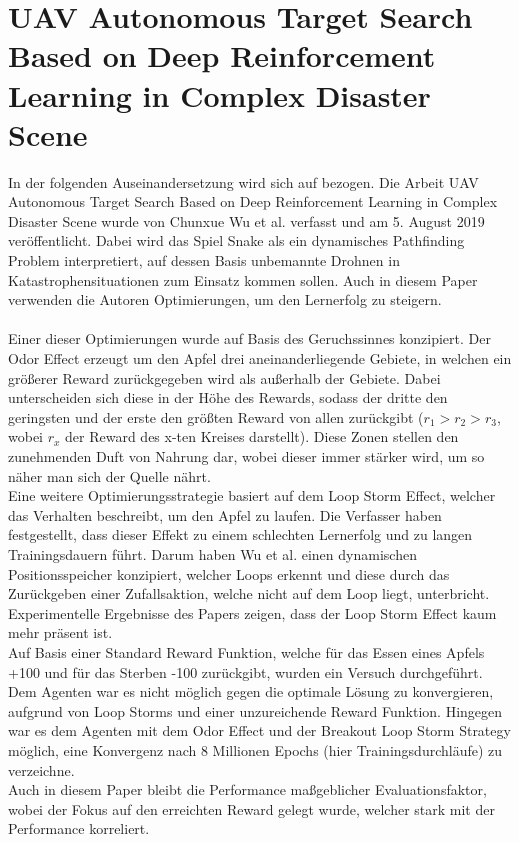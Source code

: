 \section{UAV Autonomous Target Search Based on Deep Reinforcement Learning in Complex Disaster Scene} \label{sec:Paper_2}
In der folgenden Auseinandersetzung wird sich auf \cite{UAV} bezogen.
Die Arbeit UAV Autonomous Target Search Based on Deep Reinforcement Learning in Complex Disaster Scene wurde von Chunxue Wu et al. verfasst und am 5. August 2019 veröffentlicht. Dabei wird das Spiel Snake als ein dynamisches Pathfinding Problem interpretiert, auf dessen Basis unbemannte Drohnen in Katastrophensituationen zum Einsatz kommen sollen. 
Auch in diesem Paper verwenden die Autoren Optimierungen, um den Lernerfolg zu steigern.\\
\\Einer dieser Optimierungen wurde auf Basis des Geruchssinnes konzipiert. Der Odor Effect erzeugt um den Apfel drei aneinanderliegende Gebiete, in welchen ein größerer Reward zurückgegeben wird als außerhalb der Gebiete. Dabei unterscheiden sich diese in der Höhe des Rewards, sodass der dritte den geringsten und der erste den größten Reward von allen zurückgibt ($r_1 > r_2 > r_3$, wobei $r_x$ der Reward des x-ten Kreises darstellt). Diese Zonen stellen den zunehmenden Duft von Nahrung dar, wobei dieser immer stärker wird, um so näher man sich der Quelle nährt.\\
Eine weitere Optimierungsstrategie basiert auf dem Loop Storm Effect, welcher das Verhalten beschreibt, um den Apfel zu laufen. Die Verfasser haben festgestellt, dass dieser Effekt zu einem schlechten Lernerfolg und zu langen Trainingsdauern führt. Darum haben Wu et al. einen dynamischen Positionsspeicher konzipiert, welcher Loops erkennt und diese durch das Zurückgeben einer Zufallsaktion, welche nicht auf dem Loop liegt, unterbricht. Experimentelle Ergebnisse des Papers zeigen, dass der Loop Storm Effect kaum mehr präsent ist.
\\Auf Basis einer Standard Reward Funktion, welche für das Essen eines Apfels +100 und für das Sterben -100 zurückgibt, wurden ein Versuch durchgeführt. Dem Agenten war es nicht möglich gegen die optimale Lösung zu konvergieren, aufgrund von Loop Storms und einer unzureichende Reward Funktion. Hingegen war es dem Agenten mit dem Odor Effect und der Breakout Loop Storm Strategy möglich, eine Konvergenz nach 8 Millionen Epochs (hier Trainingsdurchläufe) zu verzeichne.\\
Auch in diesem Paper bleibt die Performance maßgeblicher Evaluationsfaktor, wobei der Fokus auf den erreichten Reward gelegt wurde, welcher stark mit der Performance korreliert.

